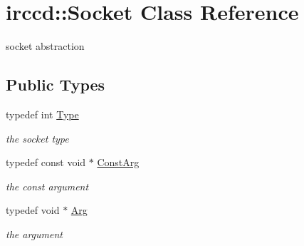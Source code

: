 \hypertarget{a00062}{\section{irccd\-:\-:Socket Class Reference}
\label{a00062}
}


socket abstraction  


\subsection*{Public Types}
\begin{DoxyCompactItemize}
\item 
\hypertarget{a00062_aca677b9c8101e7ffd76ebe00ebd6416a}{typedef int \hyperlink{a00062_aca677b9c8101e7ffd76ebe00ebd6416a}{Type}}\label{a00062_aca677b9c8101e7ffd76ebe00ebd6416a}

\begin{DoxyCompactList}\small\item\em the socket type \end{DoxyCompactList}\item 
\hypertarget{a00062_a0961e4ae0c04c27b4cf720e77a8cb66e}{typedef const void $\ast$ \hyperlink{a00062_a0961e4ae0c04c27b4cf720e77a8cb66e}{Const\-Arg}}\label{a00062_a0961e4ae0c04c27b4cf720e77a8cb66e}

\begin{DoxyCompactList}\small\item\em the const argument \end{DoxyCompactList}\item 
\hypertarget{a00062_a8b7bee713f8395731dc4271d200e77aa}{typedef void $\ast$ \hyperlink{a00062_a8b7bee713f8395731dc4271d200e77aa}{Arg}}\label{a00062_a8b7bee713f8395731dc4271d200e77aa}

\begin{DoxyCompactList}\small\item\em the argument \end{DoxyCompactList}\end{DoxyCompactItemize}
